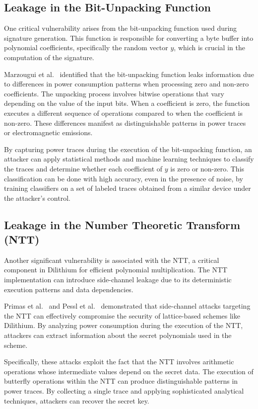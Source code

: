 \subsection{Leakage in the Bit-Unpacking Function}

One critical vulnerability arises from the bit-unpacking function used during signature generation. This function is responsible for converting a byte buffer into polynomial coefficients, specifically the random vector $y$, which is crucial in the computation of the signature.

Marzougui et al.~\cite{Marzougui22} identified that the bit-unpacking function leaks information due to differences in power consumption patterns when processing zero and non-zero coefficients. The unpacking process involves bitwise operations that vary depending on the value of the input bits. When a coefficient is zero, the function executes a different sequence of operations compared to when the coefficient is non-zero. These differences manifest as distinguishable patterns in power traces or electromagnetic emissions.

By capturing power traces during the execution of the bit-unpacking function, an attacker can apply statistical methods and machine learning techniques to classify the traces and determine whether each coefficient of $y$ is zero or non-zero. This classification can be done with high accuracy, even in the presence of noise, by training classifiers on a set of labeled traces obtained from a similar device under the attacker's control.

\subsection{Leakage in the Number Theoretic Transform (NTT)}

Another significant vulnerability is associated with the \ac{NTT}, a critical component in Dilithium for efficient polynomial multiplication. The \ac{NTT} implementation can introduce side-channel leakage due to its deterministic execution patterns and data dependencies.

Primas et al.~\cite{Primas17} and Pessl et al.~\cite{Pessl19} demonstrated that side-channel attacks targeting the \ac{NTT} can effectively compromise the security of lattice-based schemes like Dilithium. By analyzing power consumption during the execution of the \ac{NTT}, attackers can extract information about the secret polynomials used in the scheme.

Specifically, these attacks exploit the fact that the \ac{NTT} involves arithmetic operations whose intermediate values depend on the secret data. The execution of butterfly operations within the \ac{NTT} can produce distinguishable patterns in power traces. By collecting a single trace and applying sophisticated analytical techniques, attackers can recover the secret key.

